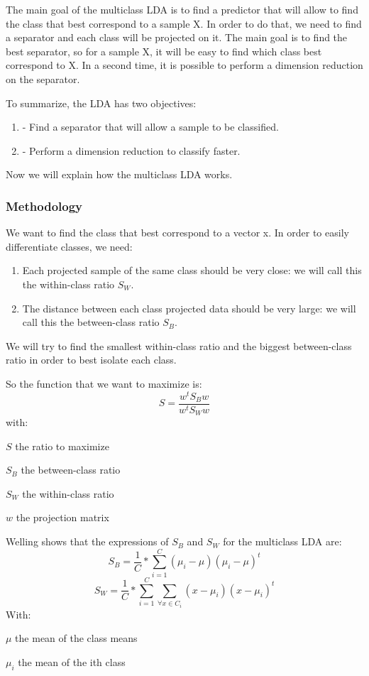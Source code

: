 The main goal of the multiclass LDA is to find a predictor that will allow to find the class that best correspond to a sample X.
In order to do that, we need to find a separator and each class will be projected on it.
The main goal is to find the best separator, so for a sample X, it will be easy to find which class
best correspond to X.
In a second time, it is possible to perform a dimension reduction on the separator.

To summarize, the LDA has two objectives:

\begin{enumerate}
\item - Find a separator that will allow a sample to be classified.
\item - Perform a dimension reduction to classify faster.
\end{enumerate}

Now we will explain how the multiclass LDA works. 

\subsubsection{Methodology}

We want to find the class that best correspond to a vector x.
In order to easily differentiate classes, we need:

\begin{enumerate}
\item Each projected sample of the same class should be very close: we will call this the within-class ratio $S_W$.
\item The distance between each class projected data should be very large: we will call this the between-class ratio $S_B$.
\end{enumerate}

We will try to find the smallest within-class ratio and the biggest between-class ratio in order to best isolate each class.

So the function that we want to maximize is:
$$S = \frac{w^t S_B w}{w^t S_W w}$$
with:
\begin{itemize*}
  \item $S$ the ratio to maximize
  \item $S_B$ the between-class ratio
  \item $S_W$ the within-class ratio
  \item $w$ the projection matrix
\end{itemize*}

Welling\cite{welling} shows that the expressions of $S_B$ and $S_W$ for the multiclass LDA are:
$$S_B = \frac{1}{C} * \sum\limits_{i = 1}^C (\mu_i - \mu)(\mu_i - \mu)^t$$
$$S_W = \frac{1}{C} * \sum\limits_{i = 1}^C \sum\limits_{\forall x \in C_i} (x - \mu_i)(x - \mu_i)^t$$
With:
\begin{itemize*}
  \item $\mu$ the mean of the class means
  \item $\mu_i$ the mean of the ith class
\end{itemize*}

